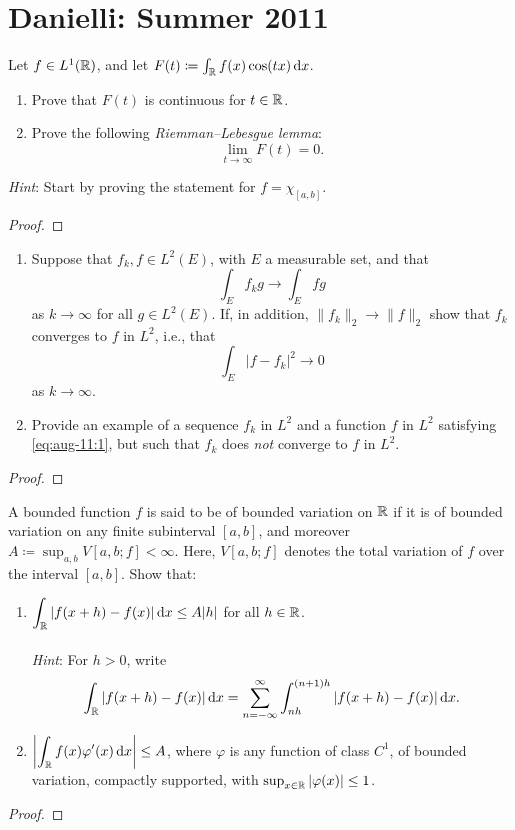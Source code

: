 \section{Danielli: Summer 2011}
\begin{problem}
Let $f\in L^1(\mathbb{R})$, and let $F(t)\coloneqq\int_{\mathbb{R}} f(x)\cos(tx)\mathop{}\!\mathrm{d} x$.
\begin{enumerate}[label=(\alph*)]
\item Prove that $F(t)$ is continuous for $t\in\mathbb{R}$.
\item Prove the following \emph{Riemman--Lebesgue lemma}:
\[
\lim_{t\to\infty}F(t)=0.
\]
\end{enumerate}
\emph{Hint}: Start by proving the statement for $f=\chi_{[a,b]}$.
\end{problem}
\begin{proof}
\end{proof}

\begin{problem}
\begin{enumerate}[label=(\alph*)]
\item Suppose that $f_k,f\in L^2(E)$, with $E$ a measurable set, and that
\begin{equation}
\label{eq:aug-11:1}
\int_E f_kg\longrightarrow\int_E fg
\end{equation}
as $k\to\infty$ for all $g\in L^2(E)$. If, in addition,
$\|f_k\|_2\to\|f\|_2$ show that $f_k$ converges to $f$ in $L^2$, i.e., that
\[
\int_E|f-f_k|^2\longrightarrow 0
\]
as $k\to\infty$.
\item Provide an example of a sequence $f_k$ in $L^2$ and a function $f$ in
  $L^2$ satisfying \eqref{eq:aug-11:1}, but such that $f_k$ does \emph{not}
  converge to $f$ in $L^2$.
\end{enumerate}
\end{problem}
\begin{proof}
\end{proof}

\begin{problem}
A bounded function $f$ is said to be of bounded variation on $\mathbb{R}$ if it
is of bounded variation on any finite subinterval $[a,b]$, and moreover
$A\coloneqq\sup_{a,b}V[a,b;f]<\infty$. Here, $V[a,b;f]$ denotes the total
variation of $f$ over the interval $[a,b]$. Show that:
\begin{enumerate}[label=(\alph*)]
\item $\displaystyle\int_{\mathbb{R}}|f(x+h)-f(x)|\mathop{}\!\mathrm{d} x\leq A|h|$ for all
  $h\in\mathbb{R}$.
\\\\
\emph{Hint}: For $h>0$, write
\[
\int_{\mathbb{R}} |f(x+h)-f(x)|\mathop{}\!\mathrm{d} x=
\sum_{n=-\infty}^\infty\int_{nh}^{(n+1)h}|f(x+h)-f(x)|\mathop{}\!\mathrm{d} x.
\]
\item $\displaystyle\left|\int_{\mathbb{R}} f(x)\varphi'(x)\mathop{}\!\mathrm{d} x\right|\leq A$,
  where $\varphi$ is any function of class $C^1$, of bounded variation,
  compactly supported, with $\sup_{x\in\mathbb{R}}|\varphi(x)|\leq 1$.
\end{enumerate}
\end{problem}
\begin{proof}
\end{proof}

